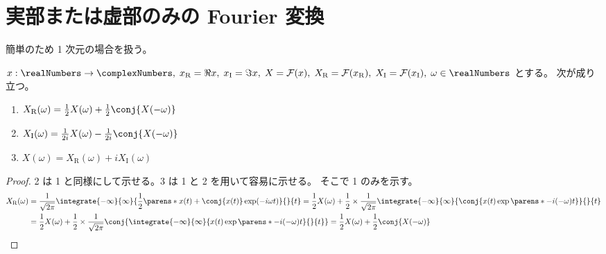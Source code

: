    \section{実部または虚部のみの Fourier 変換}
        簡単のため 1 次元の場合を扱う。
        \begin{shadebox}
            $x:\realNumbers\to\complexNumbers,\;x_\text{R} = \Re{x},\;x_\text{I} = \Im{x},\;X = \mathcal{F}(x),\;X_\text{R} = \mathcal{F}(x_\text{R}),\;X_\text{I} = \mathcal{F}(x_\text{I}),\;\omega\in\realNumbers$ とする。
            次が成り立つ。
            \begin{enumerate}
                \item $X_\text{R}(\omega) = \frac{1}{2}X(\omega) + \frac{1}{2}\conj{X(-\omega)}$
                \item $X_\text{I}(\omega) = \frac{1}{2i}X(\omega) - \frac{1}{2i}\conj{X(-\omega)}$
                \item $X(\omega) = X_\text{R}(\omega) + i X_\text{I}(\omega)$
            \end{enumerate}
        \end{shadebox}
        \begin{proof}
            \quad\par
            2 は 1 と同様にして示せる。3 は 1 と 2 を用いて容易に示せる。
            そこで 1 のみを示す。
            \begin{align*}
                X_\text{R}(\omega) &= \frac{1}{\sqrt{2\pi}}\integrate{-\infty}{\infty}{\frac{1}{2}\parens*{x(t)+\conj{x(t)}}\exp(-i\omega t)}{}{t} = \frac{1}{2}X(\omega) + \frac{1}{2}\times\frac{1}{\sqrt{2\pi}}\integrate{-\infty}{\infty}{\conj{x(t)\exp\parens*{-i(-\omega) t}}}{}{t} \\
                &= \frac{1}{2}X(\omega) + \frac{1}{2}\times\frac{1}{\sqrt{2\pi}}\conj{\integrate{-\infty}{\infty}{x(t)\exp\parens*{-i(-\omega) t}}{}{t}} = \frac{1}{2}X(\omega) + \frac{1}{2}\conj{X(-\omega)}
            \end{align*}
        \end{proof}
